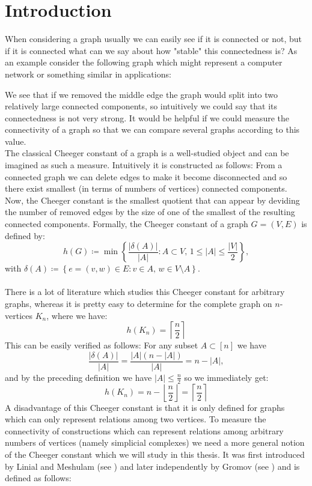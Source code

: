 
\chapter{Introduction}

\label{Introduction}
When considering a graph usually we can easily see if it is connected or not, but if it is connected what can we say about how "stable" this connectedness is? As an example consider the following graph which might represent a computer network or something similar in applications:



We see that if we removed the middle edge the graph would split into two relatively large connected components, so intuitively we could say that its connectedness is not very strong. It would be helpful if we could measure the connectivity of a graph so that we can compare several graphs according to this value.\\
The classical Cheeger constant of a graph is a well-studied object and can be imagined as such a measure. Intuitively it is constructed as follows: From a connected graph we can delete edges to make it become disconnected and so there exist smallest (in terms of numbers of vertices) connected components. Now, the Cheeger constant is the smallest quotient that can appear by deviding the number of removed edges by the size of one of the smallest of the resulting connected components. Formally, the Cheeger constant of a graph \(G=(V,E)\) is defined by:
\[
h(G)\coloneqq \min\left\{\frac{|\delta(A)|}{|A|}:A\subset V\text{, }1\leq |A|\leq\frac{|V|}{2}\right\},
\]
with \(\delta(A)\coloneqq \left\{e=(v,w)\in E:v\in A\text{, }w\in V\setminus A\right\}\).\\
\\
There is a lot of literature which studies this Cheeger constant for arbitrary graphs, whereas it is pretty easy to determine for the complete graph on \(n\)-vertices \(K_n\), where we have:
\[
h(K_n)=\left\lceil\frac{n}{2}\right\rceil
\]
This can be easily verified as follows: For any subset \(A\subset [n]\) we have
\[
\frac{|\delta(A)|}{|A|}=\frac{|A|(n-|A|)}{|A|}=n-|A|,
\]
and by the preceding definition we have \(|A|\leq\frac{n}{2}\) so we immediately get:
\[
h(K_n)=n-\left\lfloor\frac{n}{2}\right\rfloor=\left\lceil\frac{n}{2}\right\rceil
\]
A disadvantage of this Cheeger constant is that it is only defined for graphs which can only represent relations among two vertices. To measure the connectivity of constructions which can represent relations among arbitrary numbers of vertices (namely simplicial complexes) we need a more general notion of the Cheeger constant which we will study in this thesis. It was first introduced by Linial and Meshulam (see \cite{2}) and later independently by Gromov (see \cite{3}) and is defined as follows:\\
